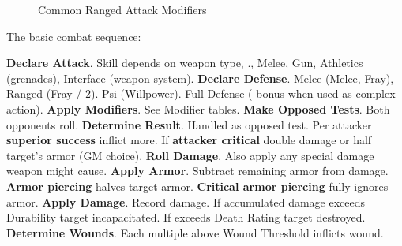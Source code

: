 \begin{figure}
\caption{Common Ranged Attack Modifiers}
\end{figure}


\bigskip

The basic combat sequence:

\begin{itemize}
    \itembox \textbf{Declare Attack}. Skill depends on weapon type, \eg., Melee, Gun, Athletics (grenades), Interface (weapon system).
    \itembox \textbf{Declare Defense}. Melee (Melee, Fray), Ranged (Fray / 2). Psi (Willpower). Full Defense ( bonus when used as complex action).
    \itembox \textbf{Apply Modifiers}. See Modifier tables.
    \itembox \textbf{Make Opposed Tests}. Both opponents roll.
    \itembox \textbf{Determine Result}. Handled as opposed test. Per attacker \textbf{superior success} inflict  more. If \textbf{attacker critical} double damage or half target's armor (GM choice).
    \itembox \textbf{Roll Damage}. Also apply any special damage weapon might cause.
    \itembox \textbf{Apply Armor}. Subtract remaining armor from damage. \textbf{Armor piercing} halves target armor. \textbf{Critical armor piercing} fully ignores armor.
    \itembox \textbf{Apply Damage}. Record damage. If accumulated damage exceeds Durability target incapacitated. If exceeds Death Rating target destroyed.
    \itembox \textbf{Determine Wounds}. Each multiple above Wound Threshold inflicts wound.
\end{itemize}



